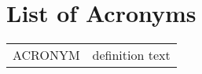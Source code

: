 \section*{List of Acronyms}

\begin{longtable}{p{3cm}p{11.5cm}}
	
ACRONYM
	& definition text\\

\end{longtable}

